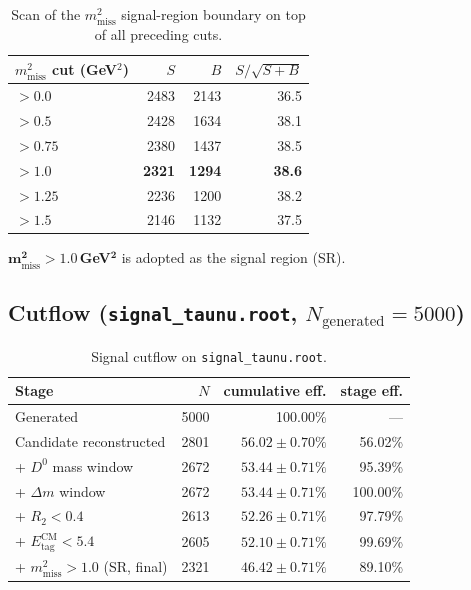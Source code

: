 \documentclass[11pt]{article}
\newcommand{\mmiss}{m^2_{\mathrm{miss}}}
\newcommand{\Etag}{E_{\mathrm{tag}}^{\mathrm{CM}}}
\begin{document}
\begin{table}[htbp]
\centering
\begin{tabular}{lrrr}
\toprule
$\mmiss$ cut (GeV$^2$) & $S$ & $B$ & $S/\sqrt{S+B}$ \\
\midrule
$>0.0$ & 2483 & 2143 & 36.5 \\
$>0.5$ & 2428 & 1634 & 38.1 \\
$>0.75$ & 2380 & 1437 & 38.5 \\
$\mathbf{>1.0}$ & \textbf{2321} & \textbf{1294} & \textbf{38.6} \\
$>1.25$ & 2236 & 1200 & 38.2 \\
$>1.5$ & 2146 & 1132 & 37.5 \\
\bottomrule
\end{tabular}
\caption{Scan of the $\mmiss$ signal-region boundary on top of all
preceding cuts.}
\label{tab:scan_m2miss}
\end{table}

$\boldsymbol{\mmiss > 1.0}$\,\textbf{GeV}$^{\mathbf{2}}$ is adopted as
the signal region (SR).

\subsection{Cutflow (\texttt{signal\_taunu.root}, \texorpdfstring{$N_{\mathrm{generated}} = 5000$}{N generated = 5000})}
\label{sec:cutflow}

\begin{table}[htbp]
\centering
\begin{tabular}{lrrr}
\toprule
Stage & $N$ & cumulative eff. & stage eff. \\
\midrule
Generated & 5000 & 100.00\% & --- \\
Candidate reconstructed & 2801 & $56.02 \pm 0.70\%$ & 56.02\% \\
+ $D^0$ mass window & 2672 & $53.44 \pm 0.71\%$ & 95.39\% \\
+ $\Delta m$ window & 2672 & $53.44 \pm 0.71\%$ & 100.00\% \\
+ $R_2 < 0.4$ & 2613 & $52.26 \pm 0.71\%$ & 97.79\% \\
+ $\Etag < 5.4$ & 2605 & $52.10 \pm 0.71\%$ & 99.69\% \\
+ $\mmiss > 1.0$ (SR, final) & 2321 & $\mathbf{46.42 \pm 0.71\%}$ & 89.10\% \\
\bottomrule
\end{tabular}
\caption{Signal cutflow on \texttt{signal\_taunu.root}.}
\label{tab:cutflow}
\end{table}
\end{document}
